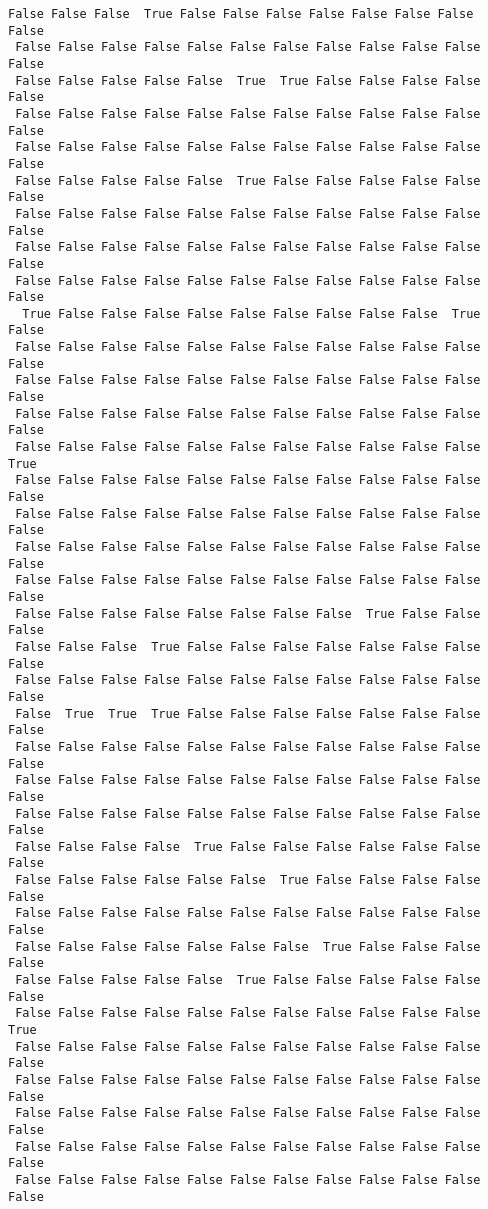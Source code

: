 \documentclass[11pt]{article}
\begin{document}
\begin{Verbatim}[commandchars=\\\{\}]
 False False False  True False False False False False False False False
 False False False False False False False False False False False False
 False False False False False  True  True False False False False False
 False False False False False False False False False False False False
 False False False False False False False False False False False False
 False False False False False  True False False False False False False
 False False False False False False False False False False False False
 False False False False False False False False False False False False
 False False False False False False False False False False False False
  True False False False False False False False False False  True False
 False False False False False False False False False False False False
 False False False False False False False False False False False False
 False False False False False False False False False False False False
 False False False False False False False False False False False  True
 False False False False False False False False False False False False
 False False False False False False False False False False False False
 False False False False False False False False False False False False
 False False False False False False False False False False False False
 False False False False False False False False  True False False False
 False False False  True False False False False False False False False
 False False False False False False False False False False False False
 False  True  True  True False False False False False False False False
 False False False False False False False False False False False False
 False False False False False False False False False False False False
 False False False False False False False False False False False False
 False False False False  True False False False False False False False
 False False False False False False  True False False False False False
 False False False False False False False False False False False False
 False False False False False False False  True False False False False
 False False False False False  True False False False False False False
 False False False False False False False False False False False  True
 False False False False False False False False False False False False
 False False False False False False False False False False False False
 False False False False False False False False False False False False
 False False False False False False False False False False False False
 False False False False False False False False False False False False

\end{Verbatim}
\end{document}
